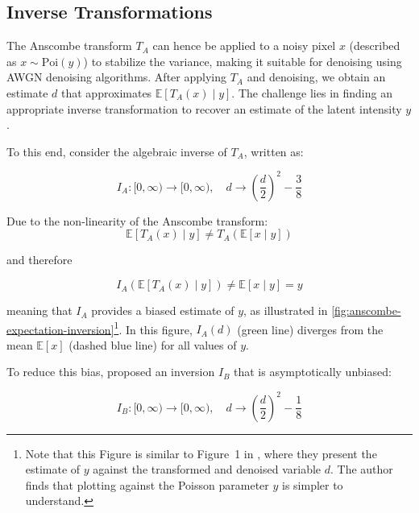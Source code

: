 \subsection{Inverse Transformations}
The Anscombe transform $T_A$ can hence be applied to a noisy pixel $x$ (described as $x \sim \text{Poi}(y)$) to stabilize the variance, making it suitable for denoising using \gls{AWGN} denoising algorithms. After applying $T_A$ and denoising, we obtain an estimate $d$ that approximates $\mathbb{E}[T_A(x) \mid y]$. The challenge lies in finding an appropriate inverse transformation to recover an estimate of the latent intensity $y$. 

To this end, consider the algebraic inverse of $T_A$, written as:

\begin{equation}
    I_A: [0, \infty) \to [0, \infty), \quad d \to \left(\frac{d}{2} \right)^2 - \frac{3}{8}
\end{equation}

Due to the non-linearity of the Anscombe transform:
\begin{equation*}
    \mathbb{E}[T_A(x) \mid y] \neq T_A(\mathbb{E}[x \mid y])
\end{equation*}

and therefore

\begin{equation*}
    I_A(\mathbb{E}[T_A(x) \mid y]) \neq \mathbb{E}[x \mid y] = y
\end{equation*}

meaning that $I_A$ provides a biased estimate of $y$, as illustrated in \cref{fig:anscombe-expectation-inversion}\footnote{Note that this Figure is similar to Figure~1 in \cite{makitaloOptimalInversionAnscombe2011}, where they present the estimate of $y$ against the transformed and denoised variable $d$. The author finds that plotting against the Poisson parameter $y$ is simpler to understand.}. In this figure, $I_A(d)$ (green line) diverges from the mean $\mathbb{E}[x]$ (dashed blue line) for all values of $y$. 

To reduce this bias, \citeauthor{anscombeTransformationPoissonBinomial1948} \cite{anscombeTransformationPoissonBinomial1948} proposed an inversion $I_B$ that is asymptotically unbiased:

\begin{equation}
    I_B: [0, \infty) \to [0, \infty), \quad d \to \left(\frac{d}{2} \right)^2 - \frac{1}{8}
\end{equation}

